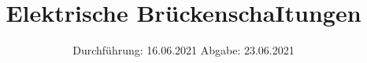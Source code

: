

\subject{Versuch Nr.V302}
\title{Elektrische BrückenschaItungen}
\date{%
  Durchführung: 16.06.2021
  \hspace{3em}
  Abgabe: 23.06.2021
}



\maketitle
\thispagestyle{empty}
\tableofcontents
\newpage 








\nocite{*}

\printbibliography{}


